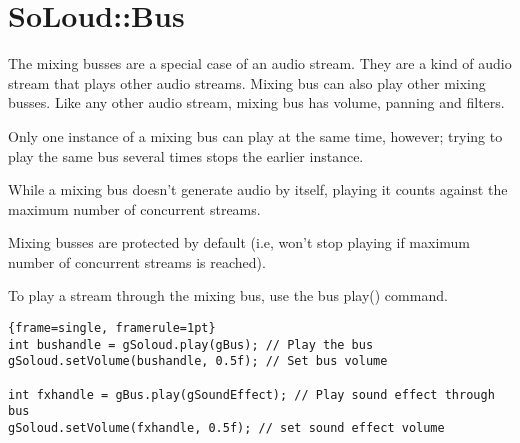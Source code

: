 
\chapter{SoLoud::Bus}

The mixing busses are a special case of an audio stream. They are a kind of audio stream that plays other audio streams. Mixing bus can also play other mixing busses. Like any other audio stream, mixing bus has volume, panning and filters.

Only one instance of a mixing bus can play at the same time, however; trying to play the same bus several times stops the earlier instance.

While a mixing bus doesn't generate audio by itself, playing it counts against the maximum number of concurrent streams.

Mixing busses are protected by default (i.e, won't stop playing if maximum number of concurrent streams is reached).

To play a stream through the mixing bus, use the bus play() command.

\begin{lstlisting}{frame=single, framerule=1pt}
int bushandle = gSoloud.play(gBus); // Play the bus
gSoloud.setVolume(bushandle, 0.5f); // Set bus volume

int fxhandle = gBus.play(gSoundEffect); // Play sound effect through bus
gSoloud.setVolume(fxhandle, 0.5f); // set sound effect volume
\end{lstlisting}
